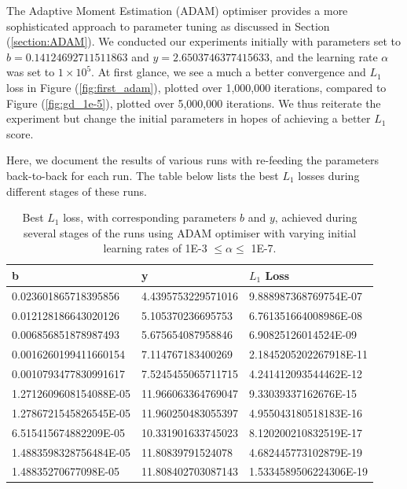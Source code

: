 \documentclass[a4paper]{report}
\begin{document}
The Adaptive Moment Estimation (ADAM) optimiser provides a more sophisticated approach to parameter tuning as discussed in Section (\ref{section:ADAM}). We conducted our experiments initially with parameters set to $b = 0.14124692711511863$ and $y = 2.6503746377415633$, and the learning rate $\alpha$ was set to $1 \times 10^{5}$. At first glance, we see a much a better convergence and $L_1$ loss in Figure (\ref{fig:first_adam}), plotted over 1,000,000 iterations, compared to Figure (\ref{fig:gd_1e-5}), plotted over 5,000,000 iterations. We thus reiterate the experiment but change the initial parameters in hopes of achieving a better $L_1$ score. 

Here, we document the results of various runs with re-feeding the parameters back-to-back for each run. The table below lists the best $L_1$ losses during different stages of these runs.

\begin{table}[ht]
\centering
\begin{tabular}{|l|l|l|}
\hline
b & y & $L_1$ Loss \\
\hline
0.023601865718395856 & 4.4395753229571016 & 9.888987368769754E-07 \\
0.012128186643020126 & 5.105370236695753 & 6.761351664008986E-08 \\
0.006856851878987493 & 5.675654087958846 & 6.90825126014524E-09 \\
0.0016260199411660154 & 7.114767183400269 & 2.1845205202267918E-11 \\
0.0010793477830991617 & 7.5245455065711715 & 4.241412093544462E-12 \\
1.2712609608154088E-05 & 11.966063364769047 & 9.33039337162676E-15 \\
1.2786721545826545E-05 & 11.960250483055397 & 4.955043180518183E-16 \\
6.515415674882209E-05 & 10.331901633745023 & 8.120200210832519E-17 \\
1.4883598328756484E-05 & 11.80839791524078 & 4.682445773102879E-19 \\
1.48835270677098E-05 & 11.808402703087143 & 1.5334589506224306E-19 \\
\hline
\end{tabular}
\caption{Best $L_1$ loss, with corresponding parameters $b$ and $y$,  achieved during several stages of the runs using ADAM optimiser with varying initial learning rates of 1E-3 $\leq \alpha \leq$ 1E-7.}
\end{table}
\end{document}
